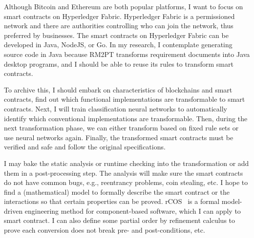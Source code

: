 Although Bitcoin and Ethereum are both popular platforms, I want to focus on smart contracts on Hyperledger Fabric.
Hyperledger Fabric is a permissioned network and there are authorities controlling who can join the network, thus preferred by businesses.
The smart contracts on Hyperledger Fabric can be developed in Java, NodeJS, or Go.
In my research, I contemplate generating source code in Java because RM2PT transforms requirement documents into Java desktop programs,
and I should be able to reuse its rules to transform smart contracts.

To archive this, I should embark on characteristics of blockchains and smart contracts, find out which functional implementations are transformable to smart contracts.
Next, I will train classification neural networks to automatically identify which conventional implementations are transformable.
Then, during the next transformation phase, we can either transform based on fixed rule sets or use neural networks again.
Finally, the transformed smart contracts must be verified and safe and follow the original specifications.

I may bake the static analysis or runtime checking into the transformation or add them in a post-processing step.
The analysis will make sure the smart contracts do not have common bugs, e.g., reentrancy problems, coin stealing, etc.
I hope to find a (mathematical) model to formally describe the smart contract or the interactions so that certain properties can be proved.
rCOS~\cite{ke2012rcos} is a formal model-driven engineering method for component-based software, which I can apply to smart contract.
I can also define some partial order by refinement calculus to prove each conversion does not break pre- and post-conditions, etc.











